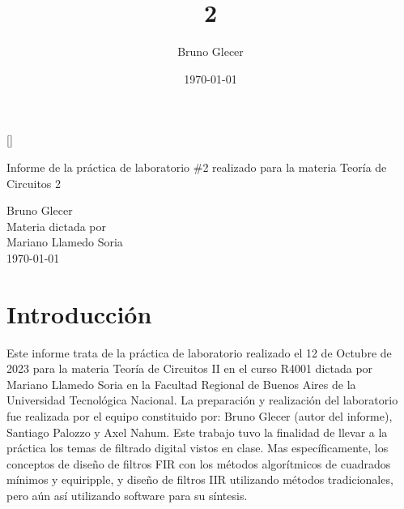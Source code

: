 \documentclass[11pt,a4paper]{report}
\title{2}
\author{Bruno Glecer}
\date{\today}
\begin{document}

\sloppy
{}

\begin{titlepage}

\titleformat{\subsection}[runin]{}{}{}{}[]

\centering
\vspace{7cm}
\huge Informe de la práctica de laboratorio \#2 realizado para la materia Teoría de Circuitos 2\\
\vspace{2cm}


\Large Bruno Glecer\\
\vspace{2cm}
\large Materia dictada por\\
\large Mariano Llamedo Soria\\
\vspace{2cm}
\daymonthyear\today \\
\vspace{1cm}
\end{titlepage}




\chapter*{\centering\Large\bfseries Introducción}

Este informe trata de la práctica de laboratorio realizado el 12 de Octubre de 2023 para la materia Teoría de Circuitos II en el curso R4001 dictada por Mariano Llamedo Soria en la Facultad Regional de Buenos Aires de la Universidad Tecnológica Nacional. La preparación y realización del laboratorio fue realizada por el equipo constituido por: Bruno Glecer (autor del informe), Santiago Palozzo y Axel Nahum. Este trabajo tuvo la finalidad de llevar a la práctica los temas de filtrado digital vistos en clase. Mas específicamente, los conceptos de diseño de filtros FIR con los métodos algorítmicos de cuadrados mínimos y equiripple, y diseño de filtros IIR utilizando métodos tradicionales, pero aún así utilizando software para su síntesis.
\end{document}
